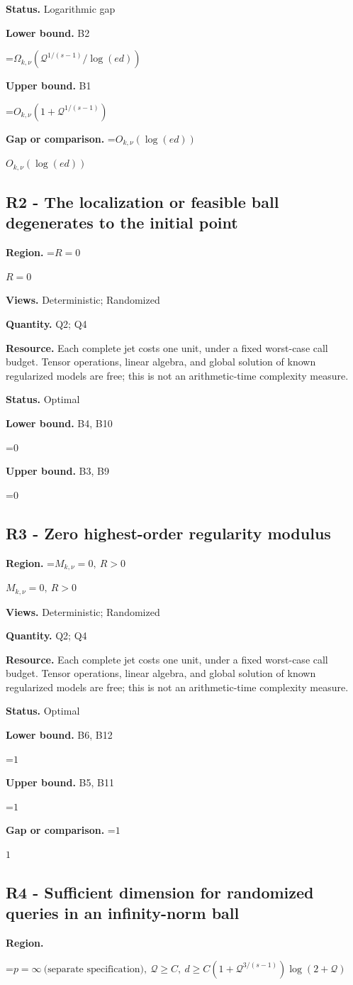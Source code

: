 \documentclass[10pt,a4paper]{article}
\newcommand{\AtlasMath}[1]{\par\begingroup\centering\setbox0=\hbox{$\displaystyle #1$}\ifdim\wd0>1.4\linewidth\typeout{ATLAS WIDE FORMULA: \the\wd0}\fi\ifdim\wd0>\linewidth\resizebox{\linewidth}{!}{\box0}\else\box0\fi\par\endgroup}
\newcommand{\AtlasInlineMath}[1]{\begingroup\setbox0=\hbox{$#1$}\ifdim\wd0>.4\linewidth\endgroup\AtlasMath{#1}\else\endgroup$#1$\fi}
\begin{document}
\textbf{Status.} Logarithmic gap

\textbf{Lower bound.} B2

\AtlasMath{\Omega_{k,\nu}(\mathcal{Q}^{1/(s-1)}/\log(ed))}
\textbf{Upper bound.} B1

\AtlasMath{O_{k,\nu}(1+\mathcal{Q}^{1/(s-1)})}
\textbf{Gap or comparison.} \AtlasInlineMath{O_{k,\nu}(\log(ed))}

\subsection{R2 - The localization or feasible ball degenerates to the initial point}
\textbf{Region.} \AtlasInlineMath{R=0}

\textbf{Views.} Deterministic; Randomized

\textbf{Quantity.} Q2; Q4

\textbf{Resource.} Each complete jet costs one unit, under a fixed worst-case call budget. Tensor operations, linear algebra, and global solution of known regularized models are free; this is not an arithmetic-time complexity measure.

\textbf{Status.} Optimal

\textbf{Lower bound.} B4, B10

\AtlasMath{0}
\textbf{Upper bound.} B3, B9

\AtlasMath{0}
\subsection{R3 - Zero highest-order regularity modulus}
\textbf{Region.} \AtlasInlineMath{M_{k,\nu}=0,\ R>0}

\textbf{Views.} Deterministic; Randomized

\textbf{Quantity.} Q2; Q4

\textbf{Resource.} Each complete jet costs one unit, under a fixed worst-case call budget. Tensor operations, linear algebra, and global solution of known regularized models are free; this is not an arithmetic-time complexity measure.

\textbf{Status.} Optimal

\textbf{Lower bound.} B6, B12

\AtlasMath{1}
\textbf{Upper bound.} B5, B11

\AtlasMath{1}
\textbf{Gap or comparison.} \AtlasInlineMath{1}

\subsection{R4 - Sufficient dimension for randomized queries in an infinity-norm ball}
\textbf{Region.} 
\AtlasMath{p=\infty\ \text{(separate specification)},\ \mathcal{Q}\ge C,\ d\ge C(1+\mathcal{Q}^{3/(s-1)})\log(2+\mathcal{Q})}
\end{document}
